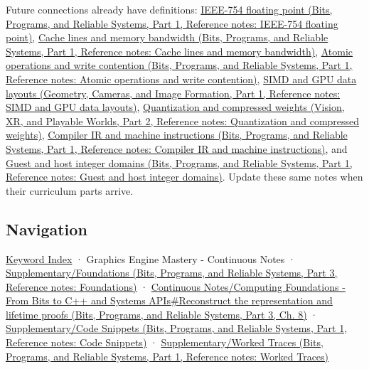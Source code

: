 Future connections already have definitions: \href{../01-Bits-Programs-and-Reliable-Systems-P01/main.pdf\#nameddest=appendix-343615f49ddf}{IEEE-754 floating point (Bits, Programs, and Reliable Systems, Part 1, Reference notes: IEEE-754 floating point)}, \href{../01-Bits-Programs-and-Reliable-Systems-P01/main.pdf\#nameddest=appendix-e4ccdbab8320}{Cache lines and memory bandwidth (Bits, Programs, and Reliable Systems, Part 1, Reference notes: Cache lines and memory bandwidth)}, \href{../01-Bits-Programs-and-Reliable-Systems-P01/main.pdf\#nameddest=appendix-e12d1b03fefb}{Atomic operations and write contention (Bits, Programs, and Reliable Systems, Part 1, Reference notes: Atomic operations and write contention)}, \href{../03-Geometry-Cameras-and-Image-Formation-P01/main.pdf\#nameddest=appendix-3c7b1a56de01}{SIMD and GPU data layouts (Geometry, Cameras, and Image Formation, Part 1, Reference notes: SIMD and GPU data layouts)}, \href{../07-Vision-XR-and-Playable-Worlds-P02/main.pdf\#nameddest=appendix-fdc7879e8bf2}{Quantization and compressed weights (Vision, XR, and Playable Worlds, Part 2, Reference notes: Quantization and compressed weights)}, \href{../01-Bits-Programs-and-Reliable-Systems-P01/main.pdf\#nameddest=appendix-942ad41afb30}{Compiler IR and machine instructions (Bits, Programs, and Reliable Systems, Part 1, Reference notes: Compiler IR and machine instructions)}, and \href{../01-Bits-Programs-and-Reliable-Systems-P01/main.pdf\#nameddest=appendix-33e7a011b684}{Guest and host integer domains (Bits, Programs, and Reliable Systems, Part 1, Reference notes: Guest and host integer domains)}. Update these same notes when their curriculum parts arrive.

\subsection{Navigation}\label{appendix-4ad47bdd269a-navigation}

\hypertarget{appendix-4ad47bdd269a-navigation}{}

\hyperref[appendix-a6d556a4ef50]{Keyword Index} · {Graphics Engine Mastery - Continuous Notes} · \href{../01-Bits-Programs-and-Reliable-Systems-P03/main.pdf\#nameddest=appendix-fd090d982a15}{Supplementary/Foundations (Bits, Programs, and Reliable Systems, Part 3, Reference notes: Foundations)} · \href{../01-Bits-Programs-and-Reliable-Systems-P03/main.pdf\#nameddest=01-foundations-i-ch010-reconstruct-the-representation-and-lifetime-proofs}{Continuous Notes/Computing Foundations - From Bits to C++ and Systems APIs\#Reconstruct the representation and lifetime proofs (Bits, Programs, and Reliable Systems, Part 3, Ch. 8)} · \href{../01-Bits-Programs-and-Reliable-Systems-P01/main.pdf\#nameddest=appendix-4e2236f53445}{Supplementary/Code Snippets (Bits, Programs, and Reliable Systems, Part 1, Reference notes: Code Snippets)} · \href{../01-Bits-Programs-and-Reliable-Systems-P01/main.pdf\#nameddest=appendix-92ff77d4dfdc}{Supplementary/Worked Traces (Bits, Programs, and Reliable Systems, Part 1, Reference notes: Worked Traces)}

